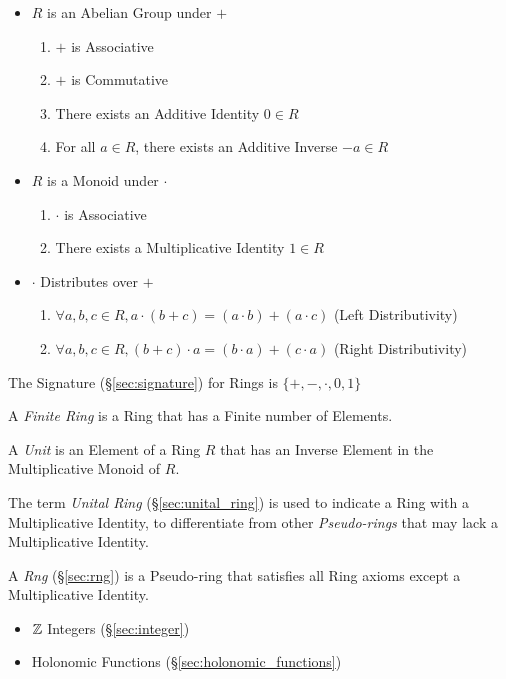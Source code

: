 \begin{itemize}
\item $R$ is an Abelian Group under $+$
    \begin{enumerate}
        \item $+$ is Associative
        \item $+$ is Commutative
        \item There exists an Additive Identity $0 \in R$
        \item For all $a \in R$, there exists an Additive Inverse $-a
          \in R$
    \end{enumerate}
\item $R$ is a Monoid under $\cdot$
    \begin{enumerate}
        \item $\cdot$ is Associative
        \item There exists a Multiplicative Identity $1 \in R$
    \end{enumerate}
\item $\cdot$ Distributes over $+$
    \begin{enumerate}
        \item $\forall a,b,c \in R,
            a \cdot (b + c) = (a \cdot b) + (a \cdot c)$
            (Left Distributivity)
        \item $\forall a,b,c \in R,
            (b + c) \cdot a = (b \cdot a) + (c \cdot a)$
            (Right Distributivity)
    \end{enumerate}
\end{itemize}
The Signature (\S\ref{sec:signature}) for Rings is $\{+, -, \cdot, 0,
1\}$

A \emph{Finite Ring} is a Ring that has a Finite number of Elements.

A \emph{Unit} is an Element of a Ring $R$ that has an Inverse
Element in the Multiplicative Monoid of $R$.

The term \emph{Unital Ring} (\S\ref{sec:unital_ring}) is used to
indicate a Ring with a Multiplicative Identity, to differentiate from
other \emph{Pseudo-rings} that may lack a Multiplicative Identity.

A \emph{Rng} (\S\ref{sec:rng}) is a Pseudo-ring that satisfies all
Ring axioms except a Multiplicative Identity.

\begin{itemize}
  \item $\mathbb{Z}$ Integers (\S\ref{sec:integer})
  \item Holonomic Functions (\S\ref{sec:holonomic_functions})
\end{itemize}



